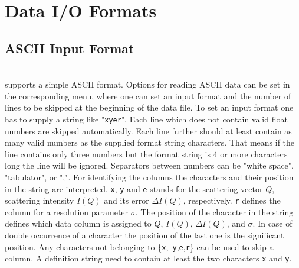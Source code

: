 \clearpage
\section{Data I/O Formats}

\subsection{ASCII Input Format} \hspace{1pt}\\

\SASfit supports a simple ASCII format. Options for reading ASCII
data can be set in the corresponding menu, where one can set an
input format and the number of lines to be skipped at the beginning
of the data file. To set an input format one has to supply a string
like "{\tt xyer}". Each line which does not contain valid float
numbers are skipped automatically. Each line further should at least
contain as many valid numbers as the supplied format string
characters. That means if the line contains only three numbers but
the format string is 4 or more characters long the line will be
ignored. Separators between numbers can be "white space",
"tabulator", or ",". For identifying the columns the characters and
their position in the string are interpreted. {\tt x}, {\tt y} and
{\tt e} stands for the scattering vector $Q$, scattering intensity
$I(Q)$ and its error $\Delta I(Q)$, respectively. {\tt r} defines
the column for a resolution parameter $\sigma$. The position of the
character in the string defines which data column is assigned to
$Q$, $I(Q)$, $\Delta I(Q)$, and $\sigma$. In case of double
occurrence of a character the position of the last one is the
significant position. Any characters not belonging to \{{\tt x},{\tt
y},{\tt e},{\tt r}\} can be used to skip a column. A definition
string need to contain
at least the two characters {\tt x} and {\tt y}. \\

